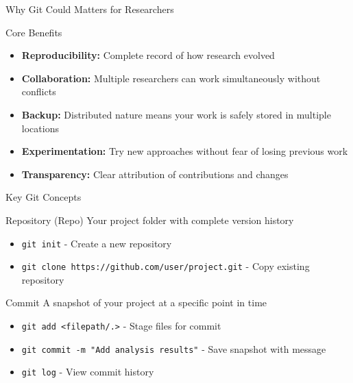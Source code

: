 \documentclass[aspectratio=1609]{beamer}
\begin{document}
\begin{frame}{ Why Git Could Matters for Researchers}
    \begin{tblock}{Core Benefits}
        \begin{itemize}
        \item \textbf{Reproducibility:} Complete record of how research evolved
        \item \textbf{Collaboration:} Multiple researchers can work simultaneously without conflicts
        \item \textbf{Backup:} Distributed nature means your work is safely stored in multiple locations
        \item \textbf{Experimentation:} Try new approaches without fear of losing previous work
        \item \textbf{Transparency:} Clear attribution of contributions and changes
    \end{itemize}
    \end{tblock}
\end{frame}


\begin{frame}[fragile]{Key Git Concepts}
    \begin{tblock}{Repository (Repo)}
        Your project folder with complete version history
        \begin{itemize}
            \item \verb|git init| - Create a new repository
            \item \verb|git clone https://github.com/user/project.git| - Copy existing repository
        \end{itemize}
        \end{tblock}
        \begin{tblock}{Commit}
            A snapshot of your project at a specific point in time
            \begin{itemize}
                \item \verb|git add <filepath/.>| - Stage files for commit
                \item \verb|git commit -m "Add analysis results"| - Save snapshot with message
                \item \verb|git log| - View commit history
            \end{itemize}
        \end{tblock}
\end{frame}
\end{document}
